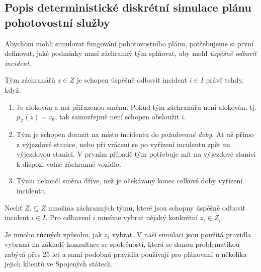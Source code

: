 \subsection{Popis deterministické diskrétní simulace plánu pohotovostní služby}\label{kap:definiceSimulace}

Abychom mohli simulovat fungování pohotovostního plánu,
potřebujeme si první definovat, jaké podmínky musí záchranný tým splňovat, aby mohl \textit{úspěšně odbavit incident}.

\begin{definice}\label{df:simulacePravidla1}
  Tým záchranářů $z \in Z$ je schopen úspěšně odbavit incident $i \in I$ právě tehdy, když:
  \begin{enumerate}
    \item
      Je alokován a má přiřazenou směnu. Pokud tým záchranářu není alokován, tj. $p_Z(z) = v_{\emptyset}$, tak samozřejmě není schopen obsloužit $i$.

    \item
      Tým je schopen dorazit na místo incidentu do \emph{požadované doby}.
      Ať už přímo z výjezdové stanice, nebo při vrácení se po vyřízení incidentu zpět na výjezdovou stanici. 
      V prvním případě tým potřebuje mít na výjezdové stanici k dispozi volné záchranné vozidlo.

    \item
      Týmu nekončí směna dříve, než je očekávaný konec celkové doby vyřízení incidentu.
  \end{enumerate}
\end{definice}

Nechť $Z_i \subseteq Z$ množina záchranných týmu, které jsou schopny úspěšně odbavit incident $i \in I$.
Pro odbavení $i$ musíme vybrat nějaký konkrétní $z_i \in Z_i$.

Je mnoho různých způsobu, jak $z_i$ vybrat.
V naší simulaci jsou použitá pravidla vybraná na základě konzultace se společností, která se danou problematikou zabývá přes 25 let
a sami podobná pravidla používají pro plánovaní u několika jejich klientů ve Spojených státech.

